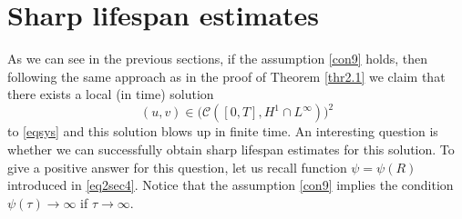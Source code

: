 \documentclass[11pt,reqno]{amsart}
\numberwithin{equation}{section}
\theoremstyle{plain}
\begin{document}
\section{Sharp lifespan estimates}
As we can see in the previous sections, if the assumption \eqref{con9} holds, then following the same approach as in the proof of Theorem \ref{thr2.1} we claim that there exists a local (in time) solution
$$ (u,v)\in \big(\mathcal{C}([0,T],H^1\cap L^{\infty})\big)^2 $$
to \eqref{eqsys} and this solution blows up in finite time. An interesting question is whether we can successfully obtain sharp lifespan estimates for this solution. To give a positive answer for this question, let us recall function $\psi= \psi(R)$ introduced in \eqref{eq2sec4}. Notice that the assumption \eqref{con9} implies the condition $\psi(\tau)\to \infty$ if $\tau\to \infty$. 
\end{document}
